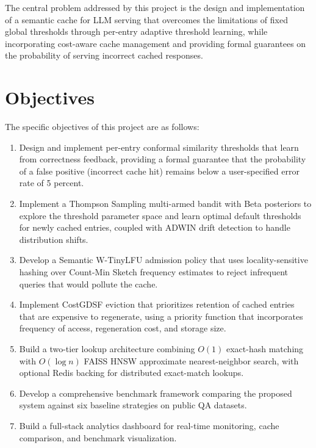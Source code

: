 \documentclass[12pt,a4paper]{report}
\begin{document}
The central problem addressed by this project is the design and implementation of a semantic cache for LLM serving that overcomes the limitations of fixed global thresholds through per-entry adaptive threshold learning, while incorporating cost-aware cache management and providing formal guarantees on the probability of serving incorrect cached responses.

\section{Objectives}

The specific objectives of this project are as follows:

\begin{enumerate}[label=(\roman*),leftmargin=2cm]
\item Design and implement per-entry conformal similarity thresholds that learn from correctness feedback, providing a formal guarantee that the probability of a false positive (incorrect cache hit) remains below a user-specified error rate of 5 percent.

\item Implement a Thompson Sampling multi-armed bandit with Beta posteriors to explore the threshold parameter space and learn optimal default thresholds for newly cached entries, coupled with ADWIN drift detection to handle distribution shifts.

\item Develop a Semantic W-TinyLFU admission policy that uses locality-sensitive hashing over Count-Min Sketch frequency estimates to reject infrequent queries that would pollute the cache.

\item Implement CostGDSF eviction that prioritizes retention of cached entries that are expensive to regenerate, using a priority function that incorporates frequency of access, regeneration cost, and storage size.

\item Build a two-tier lookup architecture combining $O(1)$ exact-hash matching with $O(\log n)$ FAISS HNSW approximate nearest-neighbor search, with optional Redis backing for distributed exact-match lookups.

\item Develop a comprehensive benchmark framework comparing the proposed system against six baseline strategies on public QA datasets.

\item Build a full-stack analytics dashboard for real-time monitoring, cache comparison, and benchmark visualization.
\end{enumerate}
\end{document}
